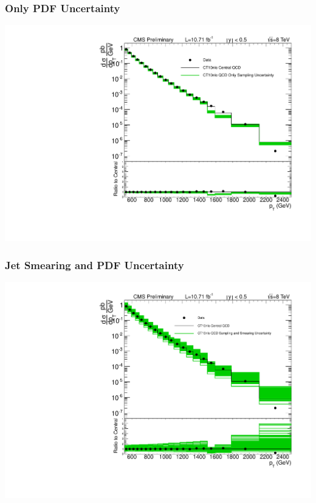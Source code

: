 \documentclass{beamer}
\begin{document}
\begin{frame}
	\frametitle{Only PDF Uncertainty}
	\begin{*figure}
\begin{center}
 \vspace {0.05 in}
 \includegraphics [width=0.7\linewidth] {xsec_CT10nlo_QCD_only_sampling.pdf}
 \vspace {0.05 in}
\caption{}
\end{center}
\end{*figure} 
\end{frame}

\begin{frame}
	\frametitle{Jet Smearing and PDF Uncertainty}
	\begin{*figure}
\begin{center}
 \vspace {0.05 in}
 \includegraphics [width=0.7\linewidth] {xsec_CT10_QCD_sampled_and_smeared.pdf}
 \vspace {0.05 in}
\caption{ }
\end{center}
\end{*figure} 
\end{frame}
\end{document}
